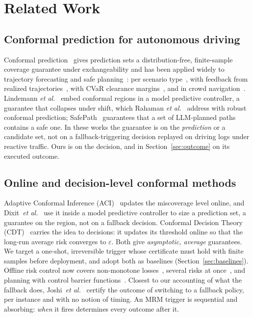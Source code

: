 \documentclass[lettersize,journal]{IEEEtran}
\begin{document}
\section{Related Work}
\label{sec:related}

\subsection{Conformal prediction for autonomous driving}
Conformal prediction~\cite{vovk2005,angelopoulos2024book} gives prediction sets a distribution-free, finite-sample coverage guarantee under exchangeability and has been applied widely to trajectory forecasting and safe planning~\cite{lindemann2024formal}: per scenario type~\cite{shu2025scenario}, with feedback from realized trajectories~\cite{wang2025fbcp}, with CVaR clearance margins~\cite{chang2026cvar}, and in crowd navigation~\cite{guo2026coconav}. Lindemann \emph{et al.}~\cite{lindemann2023} embed conformal regions in a model predictive controller, a guarantee that collapses under shift, which Rahaman \emph{et al.}~\cite{robustcp2026} address with robust conformal prediction; SafePath~\cite{safepath2025} guarantees that a set of LLM-planned paths contains a safe one. In these works the guarantee is on the \emph{prediction} or a candidate set, not on a fallback-triggering decision replayed on driving logs under reactive traffic. Ours is on the decision, and in Section~\ref{sec:outcome} on its executed outcome.

\subsection{Online and decision-level conformal methods}
Adaptive Conformal Inference (ACI)~\cite{aci2021} updates the
miscoverage level online, and Dixit~\emph{et al.}~\cite{dixit2023} use it
inside a model predictive controller to size a prediction set, a guarantee
on the region, not on a fallback decision. Conformal Decision Theory
(CDT)~\cite{cdt2024} carries the idea to decisions: it updates its
threshold online so that the long-run average risk converges to
$\varepsilon$. Both give
\emph{asymptotic, average} guarantees. We target a one-shot, irreversible
trigger whose certificate must hold with finite samples before deployment,
and adopt both as baselines (Section~\ref{sec:baselines}). Offline risk
control now covers non-monotone losses~\cite{angelopoulos2026nonmono},
several risks at once~\cite{multirisk2025}, and planning with control
barrier functions~\cite{gonzales2026}. Closest to our accounting of what
the fallback does, Joshi~\emph{et al.}~\cite{joshi2026post} certify the
outcome of switching to a fallback policy, per instance and with no notion
of timing. An MRM trigger is sequential and absorbing: \emph{when} it fires
determines every outcome after it.
\end{document}

